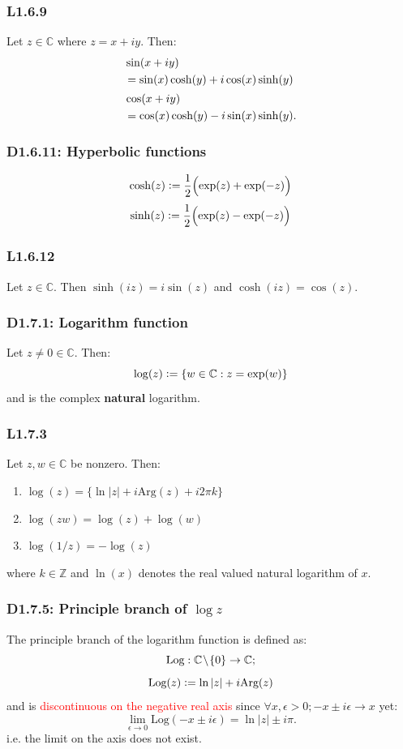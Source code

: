 \documentclass{article}
\newcommand{\deq}{\vcentcolon=}
\begin{document}
\begin{multicols*}{3}
\subsubsection*{L1.6.9}
Let $z\in\mathbb{C}$ where $z=x+iy$. Then:
\begin{align*}
    &\sin(x+iy) \\
    &=\sin(x)\cosh(y)+i\cos(x)\sinh(y)
    \newline \\[0.025in]
    &\cos(x+iy) \\
    &=\cos(x)\cosh(y)-i\sin(x)\sinh(y).
\end{align*}

\subsubsection*{D1.6.11: Hyperbolic functions}
$$\cosh(z)\deq\frac{1}{2}\Bigl(\exp(z)+\exp(-z)\Bigr)$$
$$\sinh(z)\deq\frac{1}{2}\Bigl(\exp(z)-\exp(-z)\Bigr)$$

\subsubsection*{L1.6.12}
Let $z\in\mathbb{C}$. Then $\sinh(iz)=i\sin(z)$
and $\cosh(iz)=\cos(z)$.

\subsubsection*{D1.7.1: Logarithm function}
Let $z\neq0\in\mathbb{C}$. Then:
$$\log(z)\deq\{w\in\mathbb{C}:z=\exp(w)\}$$
and is the complex \textbf{natural} logarithm.

\subsubsection*{L1.7.3}
Let $z,w\in\mathbb{C}$ be nonzero. Then:
\begin{enumerate}
    \item $\log(z)=\{\ln|z|+i\text{Arg}(z)+i2\pi k\}$
    \item $\log(zw)=\log(z)+\log(w)$
    \item $\log(1/z)=-\log(z)$
\end{enumerate}
where $k\in\mathbb{Z}$ and $\ln(x)$ denotes the
real valued natural logarithm of $x$.

\subsubsection*{D1.7.5: Principle branch of $\log z$}
The principle branch of the logarithm function
is defined as:
$$\text{Log}:\mathbb{C}\hspace{0.01in}\backslash\hspace{0.01in}\{0\}
\rightarrow\mathbb{C};$$
$$\text{Log}(z)\deq\ln|z|+i\text{Arg}(z)$$
and is \textcolor{red}{discontinuous on the negative real axis}
since $\forall x,\epsilon>0;-x\pm i\epsilon\rightarrow x$ yet:
$$\lim_{\epsilon\rightarrow0}
\text{Log}(-x\pm i\epsilon)=\ln|z|\pm i\pi.$$
i.e. the limit on the axis does not exist.


\end{multicols*}
\end{document}
